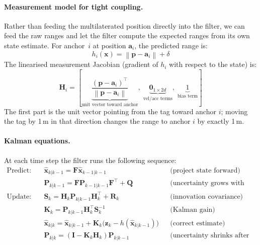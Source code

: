 \documentclass[11pt,a4paper]{article}
\newcommand{\vect}[1]{\bm{#1}}
\newcommand{\mat}[1]{\mathbf{#1}}
\newcommand{\norm}[1]{\left\|#1\right\|}
\newcommand{\Trans}{^{\top}}
\begin{document}
\paragraph{Measurement model for tight coupling.} Rather than feeding the multilaterated position directly into the filter, we can feed the raw ranges and let the filter compute the expected ranges from its own state estimate. For anchor~$i$ at position $\vect{a}_i$, the predicted range is:
\begin{equation}
h_i(\vect{x}) = \norm{\vect{p} - \vect{a}_i} + \delta
\label{eq:measmodel}
\end{equation}
The linearised measurement Jacobian (gradient of $h_i$ with respect to the state) is:
\begin{equation}
\mat{H}_i = \left[\underbrace{\frac{(\vect{p} - \vect{a}_i)\Trans}{\norm{\vect{p} - \vect{a}_i}}}_{\text{unit vector toward anchor}},\; \underbrace{\vect{0}_{1 \times 2d}}_{\text{vel/acc terms}},\; \underbrace{1}_{\text{bias term}}\right]
\end{equation}
The first part is the unit vector pointing from the tag toward anchor $i$; moving the tag by 1\,m in that direction changes the range to anchor $i$ by exactly 1\,m.

\paragraph{Kalman equations.} At each time step the filter runs the following sequence:
\begin{align}
\text{Predict:}\quad & \hat{\vect{x}}_{k|k-1} = \mat{F}\hat{\vect{x}}_{k-1|k-1}
 && \text{(project state forward)} \\
& \mat{P}_{k|k-1} = \mat{F}\mat{P}_{k-1|k-1}\mat{F}\Trans + \mat{Q}
 && \text{(uncertainty grows with time)} \\[4pt]
\text{Update:}\quad  & \mat{S}_k = \mat{H}_k \mat{P}_{k|k-1} \mat{H}_k\Trans + \mat{R}_k
 && \text{(innovation covariance)} \\
& \mat{K}_k = \mat{P}_{k|k-1} \mat{H}_k\Trans \mat{S}_k^{-1}
 && \text{(Kalman gain)} \\
& \hat{\vect{x}}_{k|k} = \hat{\vect{x}}_{k|k-1} + \mat{K}_k \bigl(\vect{z}_k - h(\hat{\vect{x}}_{k|k-1})\bigr)
 && \text{(correct estimate)} \\
& \mat{P}_{k|k} = (\mat{I} - \mat{K}_k \mat{H}_k)\mat{P}_{k|k-1}
 && \text{(uncertainty shrinks after update)}
\end{align}
\end{document}
